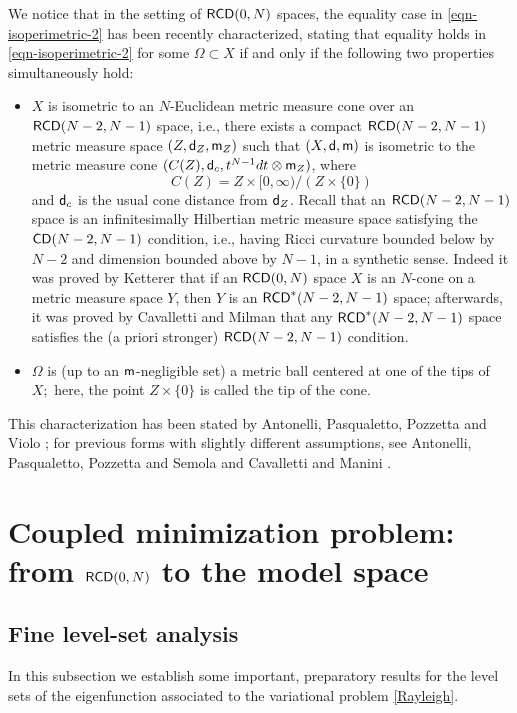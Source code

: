 \documentclass[11pt, reqno]{amsart}
\numberwithin{equation}{section}
\begin{document}
	We notice that in the setting of ${\sf RCD}(0,N)$ spaces, the equality case in \eqref{eqn-isoperimetric-2} has been recently characterized, stating that equality holds in \eqref{eqn-isoperimetric-2} for some $\Omega\subset X$ if and only if the following two properties simultaneously  hold: 
	\begin{itemize}
		\item[(i)] $X$ is isometric to an $N$-Euclidean   metric measure cone over an ${\sf RCD}(N-2,N-1)$ space, i.e., there exists a compact ${\sf RCD}(N-2,N-1)$ metric measure space $(Z,{\sf d}_Z,{\sf m}_Z)$   such that  $(X,{\sf d}, {\sf m})$ is isometric to the metric measure cone $(C(Z),{\sf d}_c,t^{N-1}{\rm d}t\otimes {\sf m}_Z)$, where $$C(Z)=Z \times [0,\infty)/(Z \times \{0\})$$ and ${\sf d}_c$ is the usual cone distance from ${\sf d}_Z$.  Recall that an ${\sf RCD}(N-2,N-1)$ space is an infinitesimally Hilbertian metric measure space satisfying the ${\sf CD}(N-2, N-1)$ condition, i.e., having Ricci curvature bounded below by $N-2$ and dimension bounded above by $N-1$, in a synthetic sense. Indeed it was proved by Ketterer \cite{Ketterer} that if an ${\sf RCD}(0,N)$ space $X$ is an $N$-cone on a metric measure space $Y$, then $Y$ is an ${\sf RCD}^*(N-2,N-1)$ space; afterwards, it was proved by Cavalletti and Milman \cite{C-M-Inv} that any ${\sf RCD}^*(N-2,N-1)$ space satisfies the (a priori stronger)  ${\sf RCD}(N-2,N-1)$ condition.   
		\item[(ii)] $\Omega$ is (up to an ${\sf m}$-negligible set) a metric ball centered
		at one of the tips of $X;$ here, the point  $Z \times \{0\}$ is called the tip of the cone.
	\end{itemize}   This characterization has been stated by Antonelli,  Pasqualetto,  Pozzetta and  Violo \cite{APPV}; for previous forms with slightly different assumptions, see Antonelli,  Pasqualetto,   Pozzetta and Semola \cite{APPS} and Cavalletti and  Manini \cite{C-M}. 
	
	
	\section{Coupled minimization problem: from ${\sf RCD}(0,N)$ to the model space}
	
	\subsection{Fine level-set analysis} In this subsection we establish some important, preparatory results for the level sets of the eigenfunction associated to the variational problem \eqref{Rayleigh}. 
	
\end{document}
